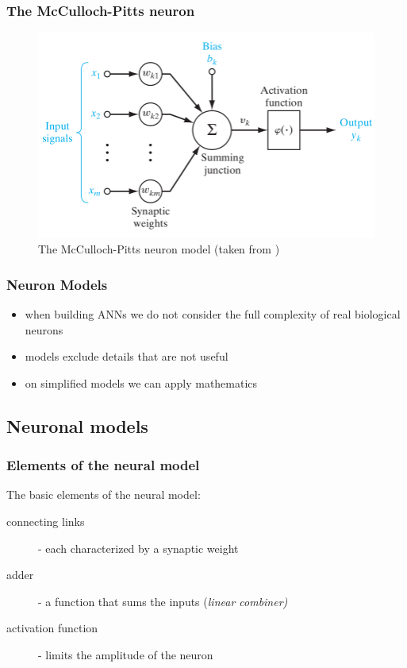 \begin{frame}
  \frametitle{The McCulloch-Pitts neuron}
  \begin{figure}[h!]
    \centering
    \includegraphics[height=.7\textheight]{graphics/neuron_model_haykin.png}
    \caption{The McCulloch-Pitts neuron model (taken from \cite{haykin2009neural})}
    \label{fig:realneuron}
  \end{figure}
\end{frame}


\begin{frame}
  \frametitle{Neuron Models}
  \begin{itemize}
  \item when building ANNs we do not consider
    the full complexity of real biological neurons
  \item models exclude details that are not useful
  \item on simplified models we can apply mathematics
  \end{itemize}
\end{frame}

\subsection{Neuronal models}
\label{sec:neuronal_models}

\begin{frame}
  \frametitle{Elements of the neural model}
  The basic elements of the neural model:
  \begin{description}
  \item[connecting links] - each characterized by a synaptic weight
  \item[adder] - a function that sums the inputs (\emph{linear combiner)}
  \item[activation function] - limits the amplitude of the neuron
  \end{description}
\end{frame}

